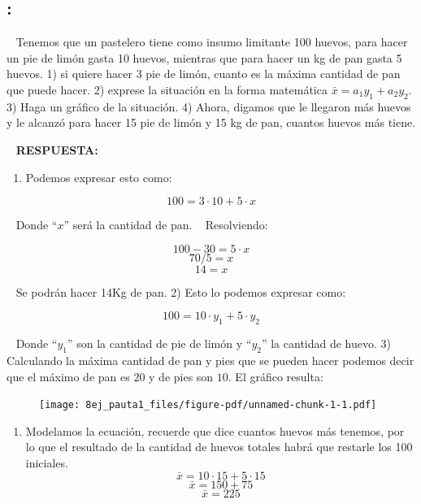 \documentclass[
  letterpaper,
  DIV=11,
  numbers=noendperiod]{scrreport}
\providecommand{\tightlist}{%
  \setlength{\itemsep}{0pt}\setlength{\parskip}{0pt}}\usepackage{longtable,booktabs,array}
\begin{document}
\hypertarget{section-23}{%
\subsection{:}\label{section-23}}

~ Tenemos que un pastelero tiene como insumo limitante 100 huevos, para
hacer un pie de limón gasta 10 huevos, mientras que para hacer un kg de
pan gasta 5 huevos. 1) si quiere hacer 3 pie de limón, cuanto es la
máxima cantidad de pan que puede hacer. 2) exprese la situación en la
forma matemática \(\bar x=a_1y_1+a_2y_2\). 3) Haga un gráfico de la
situación. 4) Ahora, digamos que le llegaron más huevos y le alcanzó
para hacer 15 pie de limón y 15 kg de pan, cuantos huevos más tiene.

~ \textbf{RESPUESTA:}

\begin{enumerate}
\def\labelenumi{\arabic{enumi})}
\tightlist
\item
  Podemos expresar esto como:
\end{enumerate}

\[
100=3\cdot 10 +5 \cdot x
\]

~ Donde ``\(x\)'' será la cantidad de pan. ~ Resolviendo:

\[
100-30= 5 \cdot x
\] \[
70/5= x
\] \[
14= x
\]

~ Se podrán hacer 14Kg de pan. 2) Esto lo podemos expresar como:

\[
100=10\cdot y_1+ 5\cdot y_2
\]

~ Donde ``\(y_1\)'' son la cantidad de pie de limón y ``\(y_2\)'' la
cantidad de huevo. 3) Calculando la máxima cantidad de pan y pies que se
pueden hacer podemos decir que el máximo de pan es \(20\) y de pies son
\(10\). El gráfico resulta:

\begin{figure}

{\centering \texttt{[image: 8ej\_pauta1\_files/figure-pdf/unnamed-chunk-1-1.pdf]}

}

\end{figure}

\begin{enumerate}
\def\labelenumi{\arabic{enumi})}
\setcounter{enumi}{3}
\tightlist
\item
  Modelamos la ecuación, recuerde que dice cuantos huevos más tenemos,
  por lo que el resultado de la cantidad de huevos totales habrá que
  restarle los 100 iniciales. \[
  \bar x=10\cdot 15+ 5\cdot 15
  \] \[
  \bar x=150+ 75
  \] \[
  \bar x=225
  \]
\end{enumerate}
\end{document}
